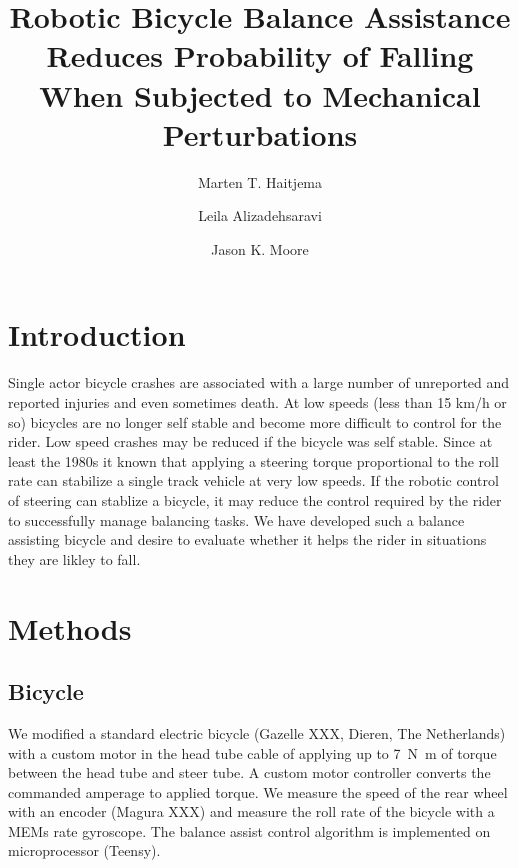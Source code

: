 \documentclass{article}
\title{Robotic Bicycle Balance Assistance Reduces Probability of Falling When
Subjected to Mechanical Perturbations}
\author{Marten T. Haitjema \and Leila Alizadehsaravi \and Jason K. Moore}
\begin{document}
\maketitle


\section{Introduction}
%
Single actor bicycle crashes are associated with a large number of unreported
and reported injuries and even sometimes death. At low speeds (less than 15
km/h or so) bicycles are no longer self stable and become more difficult to
control for the rider. Low speed crashes may be reduced if the bicycle was self
stable. Since at least the 1980s it known that applying a steering torque
proportional to the roll rate can stabilize a single track vehicle at very low
speeds. If the robotic control of steering can stablize a bicycle, it may
reduce the control required by the rider to successfully manage balancing
tasks. We have developed such a balance assisting bicycle and desire to
evaluate whether it helps the rider in situations they are likley to fall.

\section{Methods}
%
\subsection{Bicycle}
%
We modified a standard electric bicycle (Gazelle XXX, Dieren, The Netherlands)
with a custom motor in the head tube cable of applying up to
7~\si{\newton\meter} of torque between the head tube and steer tube. A custom
motor controller converts the commanded amperage to applied torque. We measure
the speed of the rear wheel with an encoder (Magura XXX) and measure the roll
rate of the bicycle with a MEMs rate gyroscope. The balance assist control
algorithm is implemented on microprocessor (Teensy).
\end{document}
